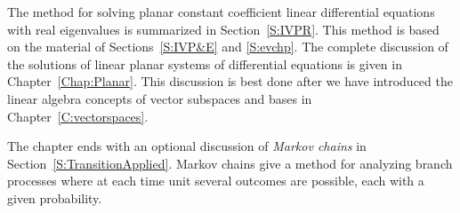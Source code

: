 \documentclass{ximera}
\begin{document}
The method for solving planar constant coefficient linear differential 
equations with real eigenvalues is summarized in Section~\ref{S:IVPR}.  This 
method is based on the material of Sections~\ref{S:IVP&E} and \ref{S:evchp}.  
The complete discussion of the solutions of linear planar systems of 
differential equations is given in Chapter~\ref{Chap:Planar}.  This discussion 
is best done after we have introduced the linear algebra concepts of vector 
subspaces and bases in Chapter~\ref{C:vectorspaces}.

The chapter ends with an optional discussion of {\em Markov chains\/} in 
Section~\ref{S:TransitionApplied}.  Markov chains give a method for 
analyzing branch processes where at each time unit several outcomes are 
possible, each with a given probability.
\end{document}
